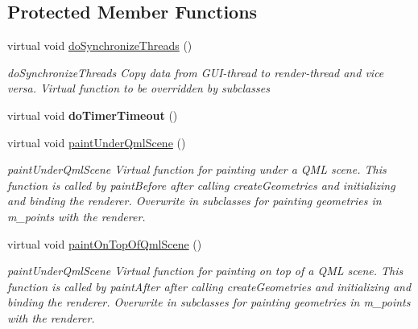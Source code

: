 \subsection*{Protected Member Functions}
\begin{DoxyCompactItemize}
\item 
\mbox{\label{class_g_l_item_aaec2f87eed24614ebed2268b10b3c342}} 
virtual void \mbox{\hyperlink{class_g_l_item_aaec2f87eed24614ebed2268b10b3c342}{do\+Synchronize\+Threads}} ()
\begin{DoxyCompactList}\small\item\em do\+Synchronize\+Threads Copy data from G\+U\+I-\/thread to render-\/thread and vice versa. Virtual function to be overridden by subclasses \end{DoxyCompactList}\item 
\mbox{\label{class_g_l_item_a5ae087d6d77f470952829beee4346af8}} 
virtual void {\bfseries do\+Timer\+Timeout} ()
\item 
\mbox{\label{class_g_l_item_a6e779fa84599e999b6e299d5aac92fa2}} 
virtual void \mbox{\hyperlink{class_g_l_item_a6e779fa84599e999b6e299d5aac92fa2}{paint\+Under\+Qml\+Scene}} ()
\begin{DoxyCompactList}\small\item\em paint\+Under\+Qml\+Scene Virtual function for painting under a Q\+ML scene. This function is called by paint\+Before after calling create\+Geometries and initializing and binding the renderer. Overwrite in subclasses for painting geometries in m\+\_\+points with the renderer. \end{DoxyCompactList}\item 
\mbox{\label{class_g_l_item_a595830cf6ae5434a253c68366275b65d}} 
virtual void \mbox{\hyperlink{class_g_l_item_a595830cf6ae5434a253c68366275b65d}{paint\+On\+Top\+Of\+Qml\+Scene}} ()
\begin{DoxyCompactList}\small\item\em paint\+Under\+Qml\+Scene Virtual function for painting on top of a Q\+ML scene. This function is called by paint\+After after calling create\+Geometries and initializing and binding the renderer. Overwrite in subclasses for painting geometries in m\+\_\+points with the renderer. \end{DoxyCompactList}\item 

\end{DoxyCompactItemize}
